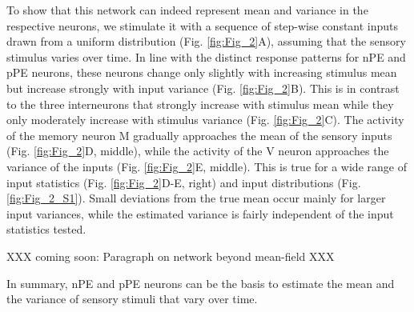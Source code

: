 \documentclass[10pt,a4paper,draft]{article}
\begin{document}
To show that this network can indeed represent mean and variance in the respective neurons, we stimulate it with a sequence of step-wise constant inputs drawn from a uniform distribution (Fig. \ref{fig:Fig_2}A), assuming that the sensory stimulus varies over time. In line with the distinct response patterns for nPE and pPE neurons, these neurons change only slightly with increasing stimulus mean but increase strongly with input variance (Fig. \ref{fig:Fig_2}B). This is in contrast to the three interneurons that strongly increase with stimulus mean while they only moderately increase with stimulus variance (Fig. \ref{fig:Fig_2}C). The activity of the memory neuron M gradually approaches the mean of the sensory inputs (Fig. \ref{fig:Fig_2}D, middle), while the activity of the V neuron approaches the variance of the inputs (Fig. \ref{fig:Fig_2}E, middle). This is true for a wide range of input statistics (Fig. \ref{fig:Fig_2}D-E, right) and input distributions (Fig. \ref{fig:Fig_2_S1}). Small deviations from the true mean occur mainly for larger input variances, while the estimated variance is fairly independent of the input statistics tested. 

XXX coming soon: Paragraph on network beyond mean-field XXX

In summary, nPE and pPE neurons can be the basis to estimate the mean and the variance of sensory stimuli that vary over time.
\end{document}
